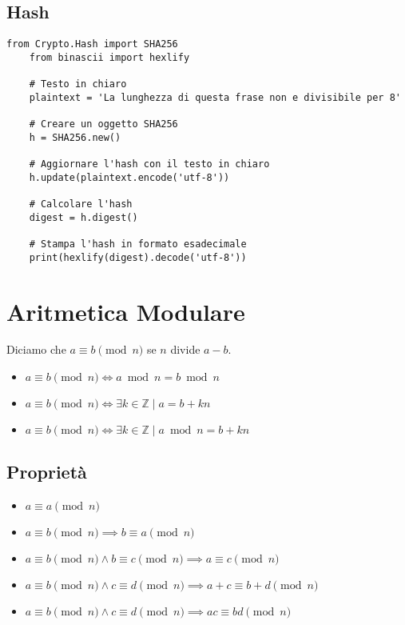 \subsection{Hash}
\begin{lstlisting}[style=pythonStyle]
    from Crypto.Hash import SHA256
    from binascii import hexlify

    # Testo in chiaro
    plaintext = 'La lunghezza di questa frase non e divisibile per 8'

    # Creare un oggetto SHA256
    h = SHA256.new()

    # Aggiornare l'hash con il testo in chiaro
    h.update(plaintext.encode('utf-8'))

    # Calcolare l'hash
    digest = h.digest()

    # Stampa l'hash in formato esadecimale
    print(hexlify(digest).decode('utf-8'))
\end{lstlisting}
\section{Aritmetica Modulare}

Diciamo che $a \equiv b \pmod{n}$ se $n$ divide $a-b$.

\begin{itemize}
    \item $a \equiv b \pmod{n} \iff a \bmod{n} = b \bmod{n}$
    \item $a \equiv b \pmod{n} \iff \exists k \in \mathbb{Z} \mid a = b + kn$
    \item $a \equiv b \pmod{n} \iff \exists k \in \mathbb{Z} \mid a \bmod{n} = b + kn$
\end{itemize}

\subsection{Proprietà}

\begin{itemize}
    \item $a \equiv a \pmod{n}$
    \item $a \equiv b \pmod{n} \implies b \equiv a \pmod{n}$
    \item $a \equiv b \pmod{n} \land b \equiv c \pmod{n} \implies a \equiv c \pmod{n}$
    \item $a \equiv b \pmod{n} \land c \equiv d \pmod{n} \implies a + c \equiv b + d \pmod{n}$
    \item $a \equiv b \pmod{n} \land c \equiv d \pmod{n} \implies ac \equiv bd \pmod{n}$
\end{itemize}

